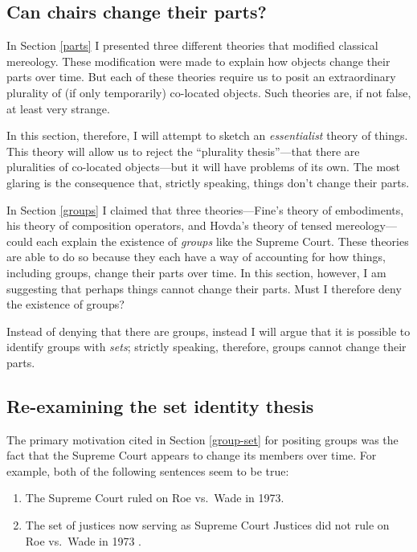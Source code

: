 \documentclass[12pt,twoside]{reedfancy}
\begin{document}
\begin{spacing}{1.25}
\chapter{Can chairs change their parts?}
\label{essential}

In Section \ref{parts} I presented three different theories that
modified classical mereology.  These modification were made to explain
how objects change their parts over time.  But each of these theories
require us to posit an extraordinary plurality of (if only
temporarily) co-located objects.  Such theories are, if not false, at
least very strange.

In this section, therefore, I will attempt to sketch an {\em
  essentialist} theory of things.  This theory will allow us to reject
the ``plurality thesis''---that there are pluralities of co-located
objects---but it will have problems of its own.  The most glaring is
the consequence that, strictly speaking, things don't change their
parts.

In Section \ref{groups} I claimed that three theories---Fine's theory
of embodiments, his theory of composition operators, and Hovda's
theory of tensed mereology---could each explain the existence of {\em
  groups} like the Supreme Court.  These theories are able to do so
because they each have a way of accounting for how things, including
groups, change their parts over time.  In this section, however, I am
suggesting that perhaps things cannot change their parts.  Must I
therefore deny the existence of groups?

Instead of denying that there are groups, instead I will argue that it
is possible to identify groups with {\em sets}; strictly speaking,
therefore, groups cannot change their parts.

\section{Re-examining the set identity thesis}
\label{set-id}
The primary motivation cited in Section \ref{group-set} for positing
groups was the fact that the Supreme Court appears to change its
members over time.  For example, both of the following sentences seem
to be true:

\begin{enumerate}[ref=(\arabic*)]
  \item The Supreme Court ruled on Roe vs.\ Wade in 1973. \label{roe1}

  \item The set of justices now serving as Supreme Court Justices did
    not rule on Roe vs.\ Wade in 1973
    \citep[135]{uzquiano2004a}. \label{roe2}
\end{enumerate}


\end{spacing}
\end{document}
